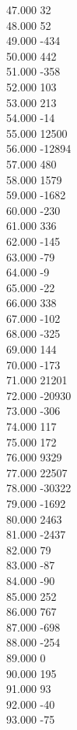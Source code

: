 { 47.000	32 \\
 48.000	52 \\
 49.000	-434 \\
 50.000	442 \\
 51.000	-358 \\
 52.000	103 \\
 53.000	213 \\
 54.000	-14 \\
 55.000	12500 \\
 56.000	-12894 \\
 57.000	480 \\
 58.000	1579 \\
 59.000	-1682 \\
 60.000	-230 \\
 61.000	336 \\
 62.000	-145 \\
 63.000	-79 \\
 64.000	-9 \\
 65.000	-22 \\
 66.000	338 \\
 67.000	-102 \\
 68.000	-325 \\
 69.000	144 \\
 70.000	-173 \\
 71.000	21201 \\
 72.000	-20930 \\
 73.000	-306 \\
 74.000	117 \\
 75.000	172 \\
 76.000	9329 \\
 77.000	22507 \\
 78.000	-30322 \\
 79.000	-1692 \\
 80.000	2463 \\
 81.000	-2437 \\
 82.000	79 \\
 83.000	-87 \\
 84.000	-90 \\
 85.000	252 \\
 86.000	767 \\
 87.000	-698 \\
 88.000	-254 \\
 89.000	0 \\
 90.000	195 \\
 91.000	93 \\
 92.000	-40 \\
 93.000	-75 \\
}
